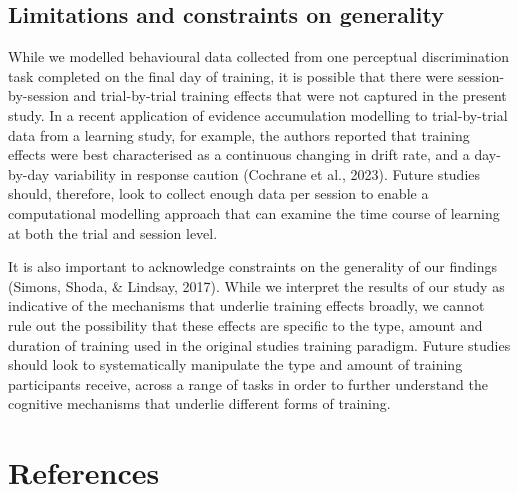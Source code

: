 \documentclass[
  man, donotrepeattitle,floatsintext]{apa6}
\begin{document}
\subsection{Limitations and constraints on generality}\label{limitations-and-constraints-on-generality}

While we modelled behavioural data collected from one perceptual discrimination task completed on the final day of training, it is possible that there were session-by-session and trial-by-trial training effects that were not captured in the present study. In a recent application of evidence accumulation modelling to trial-by-trial data from a learning study, for example, the authors reported that training effects were best characterised as a continuous changing in drift rate, and a day-by-day variability in response caution (Cochrane et al., 2023). Future studies should, therefore, look to collect enough data per session to enable a computational modelling approach that can examine the time course of learning at both the trial and session level.

It is also important to acknowledge constraints on the generality of our findings (Simons, Shoda, \& Lindsay, 2017). While we interpret the results of our study as indicative of the mechanisms that underlie training effects broadly, we cannot rule out the possibility that these effects are specific to the type, amount and duration of training used in the original studies training paradigm. Future studies should look to systematically manipulate the type and amount of training participants receive, across a range of tasks in order to further understand the cognitive mechanisms that underlie different forms of training.

\newpage

\section{References}\label{references}
\end{document}
